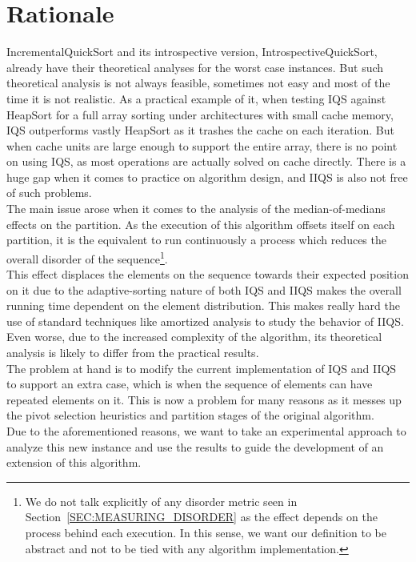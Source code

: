 
\section{Rationale}
IncrementalQuickSort and its introspective version, IntrospectiveQuickSort, already have their theoretical analyses for the worst case instances. But such theoretical analysis is not always feasible, sometimes not easy and most of the time it is not realistic. As a practical example of it, when testing IQS against HeapSort for a full array sorting under architectures with small cache memory, IQS outperforms vastly HeapSort as it trashes the cache on each iteration. But when cache units are large enough to support the entire array, there is no point on using IQS, as most operations are actually solved on cache directly. There is a huge gap when it comes to practice on algorithm design, and IIQS is also not free of such problems.\\

The main issue arose when it comes to the analysis of the median-of-medians effects on the partition. As the execution of this algorithm offsets itself on each partition, it is the equivalent to run continuously a process which reduces the overall disorder of the sequence\footnote{We do not talk explicitly of any disorder metric seen in Section~\ref{SEC:MEASURING_DISORDER} as the effect depends on the process behind each execution. In this sense, we want our definition to be abstract and not to be tied with any algorithm implementation.}.\\

This effect displaces the elements on the sequence towards their expected position on it due to the adaptive-sorting nature of both IQS and IIQS makes the overall running time dependent on the element distribution. This makes really hard the use of standard techniques like amortized analysis to study the behavior of IIQS. Even worse, due to the increased complexity of the algorithm, its theoretical analysis is likely to differ from the practical results.\\

The problem at hand is to modify the current implementation of IQS and IIQS to support an extra case, which is when the sequence of elements can have repeated elements on it. This is now a problem for many reasons as it messes up the pivot selection heuristics and partition stages of the original algorithm.\\

Due to the aforementioned reasons, we want to take an experimental approach to analyze this new instance and use the results to guide the development of an extension of this algorithm.\\

\FloatBarrier